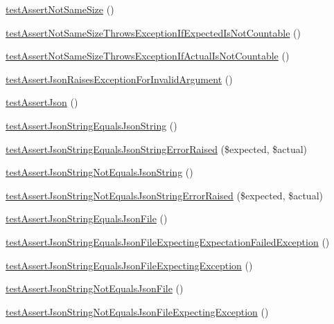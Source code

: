 \begin{DoxyCompactItemize}
\item 
\mbox{\hyperlink{class_framework___assert_test_aeb60a6ea7474a364abef33caf35c7dad}{test\+Assert\+Not\+Same\+Size}} ()
\item 
\mbox{\hyperlink{class_framework___assert_test_aa623a24a573792c7f6782a7a73cded6c}{test\+Assert\+Not\+Same\+Size\+Throws\+Exception\+If\+Expected\+Is\+Not\+Countable}} ()
\item 
\mbox{\hyperlink{class_framework___assert_test_afee5c3e3973f772daba8dcdb2935be16}{test\+Assert\+Not\+Same\+Size\+Throws\+Exception\+If\+Actual\+Is\+Not\+Countable}} ()
\item 
\mbox{\hyperlink{class_framework___assert_test_ab141ecfd47df572270ed6e28e76726ae}{test\+Assert\+Json\+Raises\+Exception\+For\+Invalid\+Argument}} ()
\item 
\mbox{\hyperlink{class_framework___assert_test_ac6c89d47a23a5e530bcb3b3f25379e43}{test\+Assert\+Json}} ()
\item 
\mbox{\hyperlink{class_framework___assert_test_a4c8084081e61eaa2d432dfff409d280a}{test\+Assert\+Json\+String\+Equals\+Json\+String}} ()
\item 
\mbox{\hyperlink{class_framework___assert_test_a9e224e2067bc22feba04f38767a70994}{test\+Assert\+Json\+String\+Equals\+Json\+String\+Error\+Raised}} (\$expected, \$actual)
\item 
\mbox{\hyperlink{class_framework___assert_test_afb275a71c1fc0abd90a3d52a2a8fbefb}{test\+Assert\+Json\+String\+Not\+Equals\+Json\+String}} ()
\item 
\mbox{\hyperlink{class_framework___assert_test_a9bede8dc93481653d9f04621106fcba5}{test\+Assert\+Json\+String\+Not\+Equals\+Json\+String\+Error\+Raised}} (\$expected, \$actual)
\item 
\mbox{\hyperlink{class_framework___assert_test_a1c0ef0ecd2470ceaad733db7f44e14d2}{test\+Assert\+Json\+String\+Equals\+Json\+File}} ()
\item 
\mbox{\hyperlink{class_framework___assert_test_aaa8ddf8e40eb1925ce1979df20c132c6}{test\+Assert\+Json\+String\+Equals\+Json\+File\+Expecting\+Expectation\+Failed\+Exception}} ()
\item 
\mbox{\hyperlink{class_framework___assert_test_a41241cc2466fe143bfe9fe80addfc95c}{test\+Assert\+Json\+String\+Equals\+Json\+File\+Expecting\+Exception}} ()
\item 
\mbox{\hyperlink{class_framework___assert_test_ada39f0b3cfe1dd08ddf38399c787efcc}{test\+Assert\+Json\+String\+Not\+Equals\+Json\+File}} ()
\item 
\mbox{\hyperlink{class_framework___assert_test_a17e2c77068fefa95a4a477679d8da4a8}{test\+Assert\+Json\+String\+Not\+Equals\+Json\+File\+Expecting\+Exception}} ()

\end{DoxyCompactItemize}
